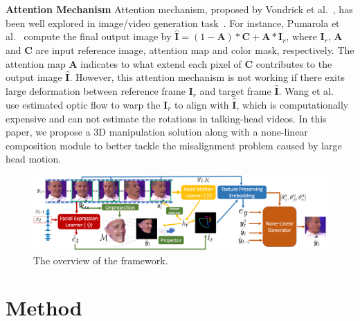 \documentclass[runningheads]{llncs}
\begin{document}
\noindent \textbf{Attention Mechanism} \quad Attention mechanism, proposed by Vondrick et al.~\cite{vondrick2016generating}, has been well explored in image/video generation task~\cite{vondrick2016generating,wang2018vid2vid,pumarola2019ganimation,chen2019hierarchical}. For instance, Pumarola et al.~\cite{pumarola2019ganimation} compute the final output image by $\hat{\mathbf{I}} = (1 - \mathbf{A}) * \mathbf{C} + \mathbf{A} * \mathbf{I}_r $, where $\mathbf{I}_r$, $\mathbf{A}$ and $\mathbf{C}$ are input reference image, attention map and color mask, respectively. The attention map $\mathbf{A}$ indicates to what extend each pixel of $\mathbf{C}$ contributes to the output image $\hat{\mathbf{I}}$. However, this attention mechanism is not working if there exits large deformation between reference frame $\mathbf{I}_r$ and target frame $\hat{\mathbf{I}}$. Wang et al.~\cite{wang2018high} use estimated optic flow to warp the $\mathbf{I}_r$ to align with $\hat{\mathbf{I}}$, which is computationally expensive and can not estimate the rotations in talking-head videos. In this paper, we propose a 3D manipulation solution along with a none-linear composition module to better tackle the misalignment problem caused by large head motion. 

\begin{figure}[t]
\includegraphics[width=1.0 \linewidth]{latex/images/main.pdf}
\caption{The overview of the framework.}
\label{fig:main}
\end{figure}

\section{Method}
\label{sec:method}
\end{document}
